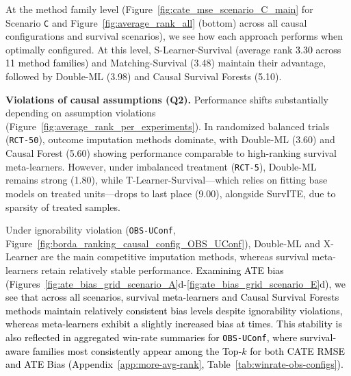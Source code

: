 \documentclass{article} %
\newcommand{\rebuttal}[1]{\textcolor{black}{#1}}
\begin{document}
At the method family level (Figure~\ref{fig:cate_mse_scenario_C_main} for Scenario \texttt{C} and Figure~\ref{fig:average_rank_all} (bottom) across all causal configurations and survival scenarios), we see how each approach performs when optimally configured. At this level, S-Learner-Survival (average rank \rebuttal{3.30 across 11 method families}) and Matching-Survival (3.48) maintain their advantage, followed by Double-ML (3.98) and Causal Survival Forests (5.10).


\textbf{Violations of causal assumptions (Q2).}
Performance shifts substantially depending on assumption violations (Figure~\ref{fig:average_rank_per_experiments}).
In randomized balanced trials (\texttt{RCT-50}), outcome imputation methods dominate, with Double-ML (3.60) and Causal Forest (5.60) showing performance comparable to high-ranking survival meta-learners. However, under imbalanced treatment (\texttt{RCT-5}), Double-ML remains strong (1.80), while T-Learner-Survival---which relies on fitting base models on treated units---drops to last place (9.00), alongside SurvITE, due to sparsity of treated samples.

Under ignorability violation (\texttt{OBS-UConf}, Figure~\ref{fig:borda_ranking_causal_config_OBS_UConf}), Double-ML and X-Learner are the main competitive imputation methods, whereas survival meta-learners retain relatively stable performance. 
\textcolor{black}{Examining ATE bias (Figures~\ref{fig:ate_bias_grid_scenario_A}d-\ref{fig:ate_bias_grid_scenario_E}d), we see that across all scenarios, survival meta-learners and Causal Survival Forests methods maintain relatively consistent bias levels despite ignorability violations, whereas meta-learners exhibit a slightly increased bias at times.} %
\rebuttal{This stability is also reflected in aggregated win-rate summaries for \texttt{OBS-UConf}, where survival-aware families most consistently appear among the Top-$k$ for both CATE RMSE and ATE Bias (Appendix~\ref{app:more-avg-rank}, Table~\ref{tab:winrate-obs-configs}).}
\end{document}
